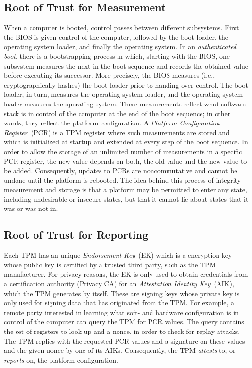 \documentclass[runningheads]{llncs}
\begin{document}
\subsection{Root of Trust for Measurement}
When a computer is booted, control passes between different subsystems. First
the BIOS is given control of the computer, followed by the boot loader, the
operating system loader, and finally the operating system. In an
\emph{authenticated boot}, there is a bootstrapping process in which, starting
with the BIOS, one subsystem measures the next in the boot sequence and records
the obtained value before executing its successor. More precisely, the BIOS
measures (i.e., cryptographically hashes) the boot loader prior to handing
over control. The boot loader, in turn, measures the operating system loader,
and the operating system loader measures the operating system.
These measurements reflect what software stack is in control of the computer
at the end of the boot sequence; in other words, they reflect the platform
configuration. A \emph{Platform Configuration Register}~(PCR) is a TPM
register where such measurements are stored and which is initialized at
startup and extended at every step of the boot sequence. In order to allow
the storage of an unlimited number of measurements in a specific PCR register,
the new value depends on both, the old value and the new value to be added.
Consequently, updates to PCRs are noncommutative and cannot be undone until
the platform is rebooted. The idea behind this process of integrity measurement
and storage is that a platform may be permitted to enter any state, including
undesirable or insecure states, but that it cannot lie about states that it
was or was not in.

\subsection{Root of Trust for Reporting}
Each TPM has an unique \emph{Endorsement Key}~(EK) which is a encryption key
whose public key is certified by a trusted third party, such as the TPM
manufacturer. For privacy reasons, the EK is only used to obtain credentials
from a certification authority (Privacy CA) for an \emph{Attestation Identity
Key}~(AIK), which the TPM generates by itself.
These are signing keys whose private key is only used for signing data that
has originated from the TPM. For example, a remote party interested in
learning what soft- and hardware configuration is in control of the computer
can query the TPM for PCR values. The query contains the set of registers to
look up and a nonce, in order to check for replay attacks.
The TPM replies with the requested PCR values and a signature on these values
and the given nonce by one of its AIKs. Consequently, the TPM \emph{attests}
to, or \emph{reports} on, the platform configuration.
\end{document}
